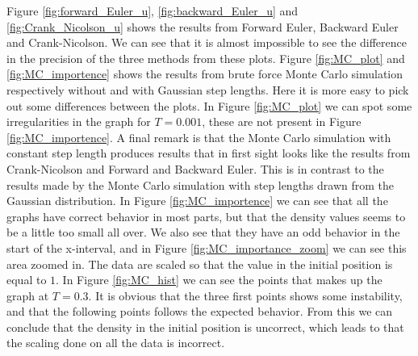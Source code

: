 \documentclass[12pt]{article}
\begin{document}
\begin{flushleft}
Figure \ref{fig:forward_Euler_u}, \ref{fig:backward_Euler_u} and \ref{fig:Crank_Nicolson_u} shows the results from Forward Euler, Backward Euler and Crank-Nicolson. We can see that it is almost impossible to see the difference in the precision of the three methods from these plots. Figure \ref{fig:MC_plot} and \ref{fig:MC_importence} shows the results from brute force Monte Carlo simulation respectively without and with Gaussian step lengths. Here it is more easy to pick out some differences between the plots. In Figure \ref{fig:MC_plot} we can spot some irregularities in the graph for $T=0.001$, these are not present in Figure \ref{fig:MC_importence}. A final remark is that the Monte Carlo simulation with constant step length produces results that in first sight looks like the results from Crank-Nicolson and Forward and Backward Euler. This is in contrast to the results made by the Monte Carlo simulation with step lengths drawn from the Gaussian distribution. In Figure \ref{fig:MC_importence} we can see that all the graphs have correct behavior in most parts, but that the density values seems to be a little too small all over. We also see that they have an odd behavior in the start of the x-interval, and in Figure \ref{fig:MC_importance_zoom} we can see this area zoomed in. The data are scaled so that the value in the initial position is equal to $1$. In Figure \ref{fig:MC_hist} we can see the points that makes up the graph at $T=0.3$. It is obvious that the three first points shows some instability, and that the following points follows the expected behavior. From this we can conclude that the density in the initial position is uncorrect, which leads to that the scaling done on all the data is incorrect.


\end{flushleft}
\end{document}
